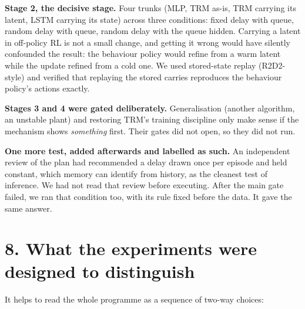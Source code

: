 \documentclass[11pt]{article}
\begin{document}
\textbf{Stage 2, the decisive stage.} Four trunks (MLP, TRM as-is, TRM carrying its latent, LSTM carrying its state) across three conditions: fixed delay with queue, random delay with queue, random delay with the queue hidden. Carrying a latent in off-policy RL is not a small change, and getting it wrong would have silently confounded the result: the behaviour policy would refine from a warm latent while the update refined from a cold one. We used stored-state replay (R2D2-style) and verified that replaying the stored carries reproduces the behaviour policy's actions exactly.



\textbf{Stages 3 and 4 were gated deliberately.} Generalisation (another algorithm, an unstable plant) and restoring TRM's training discipline only make sense if the mechanism shows \emph{something} first. Their gates did not open, so they did not run.



\textbf{One more test, added afterwards and labelled as such.} An independent review of the plan had recommended a delay drawn once per episode and held constant, which memory can identify from history, as the cleanest test of inference. We had not read that review before executing. After the main gate failed, we ran that condition too, with its rule fixed before the data. It gave the same answer.



\section*{8. What the experiments were designed to distinguish}



It helps to read the whole programme as a sequence of two-way choices:
\end{document}
